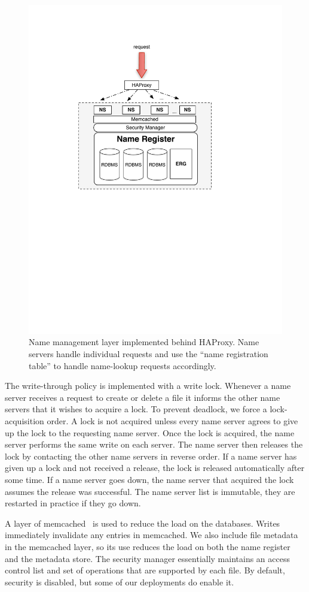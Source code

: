 \begin{figure}[h!] %
\centering
\includegraphics[width=.55\columnwidth]{figs/name_reg}
\caption{Name management layer implemented behind HAProxy.  Name servers handle individual requests and use the ``name registration table''
to handle name-lookup requests accordingly.}
\label{fig:nameserver}
\end{figure}

The write-through policy is implemented with a write lock.  Whenever a name server receives a request to create or delete a file it informs the
other name servers that it wishes to acquire a lock.  To prevent deadlock, we force a lock-acquisition order.  A lock is not acquired unless every
name server agrees to give up the lock to the requesting name server.  Once the lock is acquired, the name server performs the same write on each
server.  The name server then releases the lock by contacting the other name servers in reverse order.  If a name server has given up a lock
and not received a release, the lock is released automatically after some time.  If a name server goes down, the name server that acquired the lock
assumes the release was successful.  The name server list is immutable, they are restarted in practice if they go down.

A layer of memcached~\cite{memcached} is used to reduce the load on the databases.  Writes immediately invalidate any entries in memcached.  
We also include file metadata in the memcached layer, so its use reduces the load on both the name register and the metadata store.
The security manager essentially maintains an access control list and set of operations that are supported by each file.  By default, 
security is disabled, but some of our deployments do enable it.

